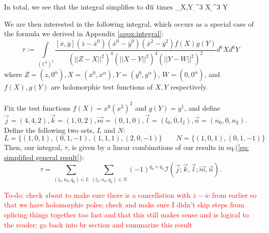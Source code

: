 \documentclass[a4paper,11pt]{article}
\begin{document}
In total, we see that the integral simplifies to $\mathrm{d} \overline u$ times 
\beqn
\int_{X,Y}  \d^3 X \d^3 Y
\eeqn

We are then interested in the following integral, which occurs as a special case of the formula we derived in Appendix \ref{appx:integral}:
\begin{equation}
    \tau := \underset{(\mathbb{C}^3)^2}{\int} \frac{ [\overline{x},\overline{y}] (\overline{z}-\overline{x}^0) (\overline{x}^0-\overline{y}^0) (\overline{x}^2-\overline{y}^2) f(X) g(Y)}{(\vert \vert Z-X \vert \vert^2)^{4} (\vert \vert X-Y \vert \vert^2)^{4} (\vert \vert Y-W \vert \vert^2)^{2}} d^6X d^6Y
\end{equation}
where $Z = (z,0^{\dot{\alpha}}), X = (x^0,x^{\dot{\alpha}}), Y = (y^0,y^{\dot{\alpha}})$, $W = (0,0^{\dot{\alpha}})$, and $f(X),g(Y)$ are holomorphic test functions of $X,Y$ respectively. \\ \\
Fix the test functions $f(X) = x^0 (x^2)^2$ and $g(Y) = y^1$, and define $\vec{j} = (4,4,2), \vec{k} = (1,0,2), \vec{m} = (0,1,0), \vec{l} = (l_0,0,l_2), \vec{n} = (n_0,0,n_2)$. Define the following two sets, $L$ and $N$:
\begin{equation}
    L = \{ (1,0,1),(0,1,-1), (1,1,1), (2,0,-1)\} \quad \quad N = \{(1,0,1),(0,1,-1)\}
\end{equation}
Then, our integral, $\tau$, is given by a linear combinations of our results in eq.(\ref{eq: simplified general result}):
\begin{equation}
    \tau = \sum_{(l_0,n_0,q_0) \in L} \sum_{(l_2,n_2,q_2) \in N} (-1)^{q_0+q_2}\mathcal{I}(\vec{j};\vec{k},\vec{l};\vec{m}, \vec{n}).   
\end{equation}

\textcolor{red}{To-do: check about to make sure there is a cancellation with $\bar{z}- \bar{w}$ from earlier so that we have holomorphic poles; check and make sure I didn't skip steps from splicing things together too fast and that this still makes sense and is logical to the reader; go back into br section and summarize this result}
\end{document}
